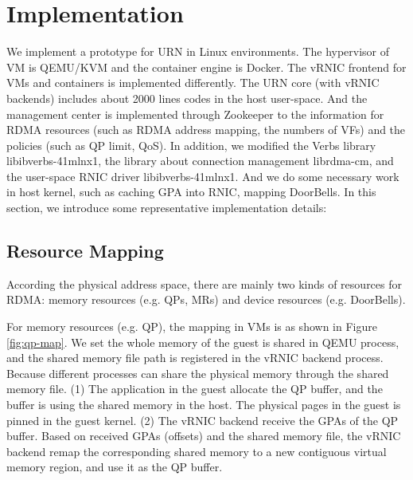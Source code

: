 \section{Implementation}
 We implement a prototype for URN in Linux environments. The hypervisor of VM is QEMU/KVM and the container engine is Docker. The vRNIC frontend for VMs and containers is implemented differently. The URN core (with vRNIC backends) includes about 2000 lines codes in the host user-space. And the management center is implemented through Zookeeper to the information for RDMA resources (such as RDMA address mapping, the numbers of VFs) and the policies (such as QP limit, QoS). In addition, we modified the Verbs library libibverbs-41mlnx1, the library about connection management librdma-cm, and the user-space RNIC driver libibverbs-41mlnx1. And we do some necessary work in host kernel, such as caching GPA into RNIC, mapping DoorBells. In this section, we introduce some representative implementation details:
 
 \subsection{Resource Mapping}
According the physical address space, there are mainly two kinds of resources for RDMA: memory resources (e.g. QPs, MRs) and device resources (e.g. DoorBells). 
 
 For memory resources (e.g. QP), the mapping in VMs is as shown in Figure \ref{fig:qp-map}. We set the whole memory of the guest is shared in QEMU process, and the shared memory file path is registered in the vRNIC backend process. Because different processes can share the physical memory through the shared memory file. (1) The application in the guest allocate the QP buffer, and the buffer is using the shared memory in the host. The physical pages in the guest is pinned in the guest kernel. (2) The vRNIC backend receive the GPAs of the QP buffer. Based on received GPAs (offsets) and the shared memory file, the vRNIC backend remap the corresponding shared memory to a new contiguous virtual memory region, and use it as the QP buffer.
 
